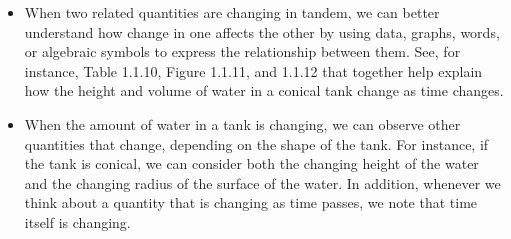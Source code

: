 \documentclass{ximera}
\begin{document}
\begin{summary}
  \begin{itemize}
\item When two related quantities are changing in tandem, we can
  better understand how change in one affects the other by using data,
  graphs, words, or algebraic symbols to express the relationship
  between them. See, for instance, Table 1.1.10, Figure 1.1.11, and
  1.1.12 that together help explain how the height and volume of water
  in a conical tank change as time changes.
\item When the amount of water in a tank is changing, we can observe
  other quantities that change, depending on the shape of the tank.
  For instance, if the tank is conical, we can consider both the
  changing height of the water and the changing radius of the surface
  of the water.  In addition, whenever we think about a quantity that
  is changing as time passes, we note that time itself is changing.
  \end{itemize}
\end{summary}
\end{document}
